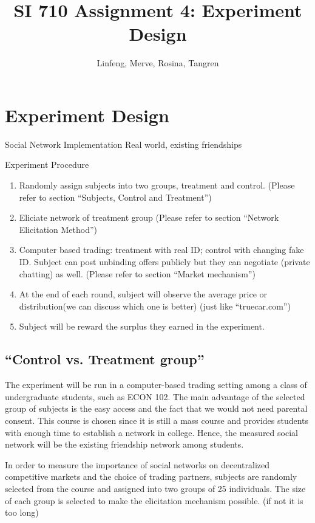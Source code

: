 \documentclass{article}
\title{SI 710 Assignment 4: Experiment Design}
\author{Linfeng, Merve, Rosina, Tangren}
\date{}
\begin{document}
\maketitle
%

\section{Experiment Design}
Social Network Implementation
Real world, existing friendships

Experiment Procedure
\begin{enumerate}
    \item Randomly assign subjects into two groups, treatment and control.
        (Please refer to section ``Subjects, Control and Treatment'')
    \item Eliciate network of treatment group (Please refer to section ``Network
        Elicitation Method'')
    \item Computer based trading: treatment with real ID; control with changing
        fake ID. Subject can post unbinding offers publicly but they can
        negotiate (private chatting) as well. (Please refer to section ``Market
        mechanism'')
    \item At the end of each round, subject will observe the average price or distribution(we can discuss which one is better) (just like ``truecar.com'')
    \item Subject will be reward the surplus they earned in the experiment.
\end{enumerate}

\subsection{``Control vs. Treatment group''}
The experiment will be run in a computer-based trading setting among a class of
undergraduate students, such as ECON 102. The main advantage of the selected
group of subjects is the easy access and the fact that we would not need
parental consent. This course is chosen since it is still a mass course and
provides students with enough time to establish a network in college. Hence, the
measured social network will be the existing friendship network among students.

In order to measure the importance of social networks on decentralized
competitive markets and the choice of trading partners, subjects are randomly
selected from the course and assigned into two groups of 25 individuals. The
size of each group is selected to make the elicitation mechanism possible. (if
not it is too long)
\end{document}
